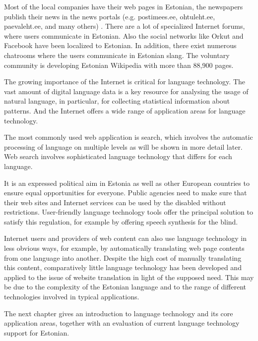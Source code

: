 \documentclass[]{../metanetpaper}
\begin{document}
\begin{multicols}{2}
Most of the local companies have their web pages in Estonian, the newspapers publish their news in the news portals (e.g. postimees.ee, ohtuleht.ee, paevaleht.ee, and many others) \cite{Neti}.
There are a lot of specialized Internet forums, where users communicate in Estonian. 
Also the social networks like Orkut and Facebook have been localized to Estonian. 
In addition, there exist numerous chatrooms where the users communicate in Estonian slang. 
The voluntary community is developing Estonian Wikipedia with more than 88,900 pages.

The growing importance of the Internet is critical for language technology. 
The vast amount of digital language data is a key resource for analysing the usage of natural language, in particular, for collecting statistical information about patterns. 
And the Internet offers a wide range of application areas for language technology. 

The most commonly used web application is search, which involves the automatic processing of language on multiple levels as will be shown in more detail later. 
Web search involves sophisticated language technology that differs for each language.

It is an expressed political aim in Estonia as well as other European countries to ensure equal opportunities for everyone.
Public agencies need to make sure that their web sites and Internet services can be used by the disabled without restrictions. 
User-friendly language technology tools offer the principal solution to satisfy this regulation, for example by offering speech synthesis for the blind.

Internet users and providers of web content can also use language technology in less obvious ways, for example, by automatically translating web page contents from one language into another. 
Despite the high cost of manually translating this content, comparatively little language technology has been developed and applied to the issue of website translation in light of the supposed need. 
This may be due to the complexity of the Estonian language and to the range of different technologies involved in typical applications. 

The next chapter gives an introduction to language technology and its core application areas, together with an evaluation of current language technology support for Estonian. 

\end{multicols}

\clearpage
\end{document}
